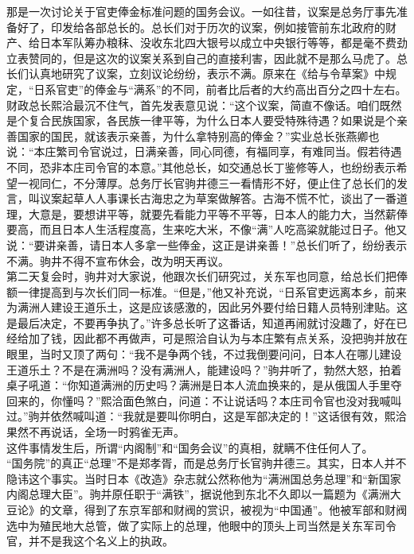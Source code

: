 那是一次讨论关于官吏俸金标准问题的国务会议。一如往昔，议案是总务厅事先准备好了，印发给各部总长的。总长们对于历次的议案，例如接管前东北政府的财产、给日本军队筹办粮秣、没收东北四大银号以成立中央银行等等，都是毫不费劲立表赞同的，但是这次的议案关系到自己的直接利害，因此就不是那么马虎了。总长们认真地研究了议案，立刻议论纷纷，表示不满。原来在《给与令草案》中规定，“日系官吏”的俸金与“满系”的不同，前者比后者的大约高出百分之四十左右。财政总长熙洽最沉不住气，首先发表意见说：“这个议案，简直不像话。咱们既然是个复合民族国家，各民族一律平等，为什么日本人要受特殊待遇？如果说是个亲善国家的国民，就该表示亲善，为什么拿特别高的俸金？”实业总长张燕卿也说：“本庄繁司令官说过，日满亲善，同心同德，有福同享，有难同当。假若待遇不同，恐非本庄司令官的本意。”其他总长，如交通总长丁鉴修等人，也纷纷表示希望一视同仁，不分薄厚。总务厅长官驹井德三一看情形不好，便止住了总长们的发言，叫议案起草人人事课长古海忠之为草案做解答。古海不慌不忙，谈出了一番道理，大意是，要想讲平等，就要先看能力平等不平等，日本人的能力大，当然薪俸要高，而且日本人生活程度高，生来吃大米，不像“满”人吃高粱就能过日子。他又说：“要讲亲善，请日本人多拿一些俸金，这正是讲亲善！”总长们听了，纷纷表示不满。驹井不得不宣布休会，改为明天再议。\\

第二天复会时，驹井对大家说，他跟次长们研究过，关东军也同意，给总长们把俸额一律提高到与次长们同一标准。“但是，”他又补充说，“日系官吏远离本乡，前来为满洲人建设王道乐土，这是应该感激的，因此另外要付给日籍人员特别津贴。这是最后决定，不要再争执了。”许多总长听了这番话，知道再闹就讨没趣了，好在已经给加了钱，因此都不再做声，可是照洽自认为与本庄繁有点关系，没把驹并放在眼里，当时又顶了两句：“我不是争两个钱，不过我倒要问问，日本人在哪儿建设王道乐土？不是在满洲吗？没有满洲人，能建设吗？”驹井听了，勃然大怒，拍着桌子吼道：“你知道满洲的历史吗？满洲是日本人流血换来的，是从俄国人手里夺回来的，你懂吗？”熙洽面色煞白，问道：不让说话吗？本庄司令官也没对我喊叫过。”驹并依然喊叫道：“我就是要叫你明白，这是军部决定的！”这话很有效，熙洽果然不再说话，全场一时鸦雀无声。\\

这件事情发生后，所谓“内阁制”和“国务会议”的真相，就瞒不住任何人了。\\

“国务院”的真正“总理”不是郑孝胥，而是总务厅长官驹井德三。其实，日本人并不隐讳这个事实。当时日本《改造》杂志就公然称他为“满洲国总务总理”和“新国家内阁总理大臣”。驹并原任职于“满铁”，据说他到东北不久即以一篇题为《满洲大豆论》的文章，得到了东京军部和财阀的赏识，被视为“中国通”。他被军部和财阀选中为殖民地大总管，做了实际上的总理，他眼中的顶头上司当然是关东军司令官，并不是我这个名义上的执政。\\

